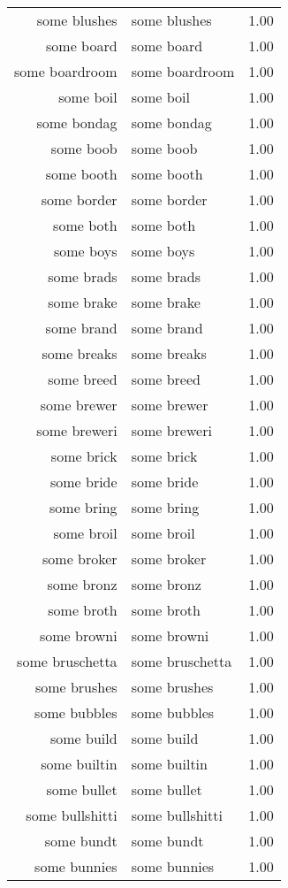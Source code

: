 \begin{table}[ht]
\begin{tabular}{rlr}
  some blushes & some blushes & 1.00 \\ 
  some board & some board & 1.00 \\ 
  some boardroom & some boardroom & 1.00 \\ 
  some boil & some boil & 1.00 \\ 
  some bondag & some bondag & 1.00 \\ 
  some boob & some boob & 1.00 \\ 
  some booth & some booth & 1.00 \\ 
  some border & some border & 1.00 \\ 
  some both & some both & 1.00 \\ 
  some boys & some boys & 1.00 \\ 
  some brads & some brads & 1.00 \\ 
  some brake & some brake & 1.00 \\ 
  some brand & some brand & 1.00 \\ 
  some breaks & some breaks & 1.00 \\ 
  some breed & some breed & 1.00 \\ 
  some brewer & some brewer & 1.00 \\ 
  some breweri & some breweri & 1.00 \\ 
  some brick & some brick & 1.00 \\ 
  some bride & some bride & 1.00 \\ 
  some bring & some bring & 1.00 \\ 
  some broil & some broil & 1.00 \\ 
  some broker & some broker & 1.00 \\ 
  some bronz & some bronz & 1.00 \\ 
  some broth & some broth & 1.00 \\ 
  some browni & some browni & 1.00 \\ 
  some bruschetta & some bruschetta & 1.00 \\ 
  some brushes & some brushes & 1.00 \\ 
  some bubbles & some bubbles & 1.00 \\ 
  some build & some build & 1.00 \\ 
  some builtin & some builtin & 1.00 \\ 
  some bullet & some bullet & 1.00 \\ 
  some bullshitti & some bullshitti & 1.00 \\ 
  some bundt & some bundt & 1.00 \\ 
  some bunnies & some bunnies & 1.00 \\ 

\end{tabular}
\end{table}
